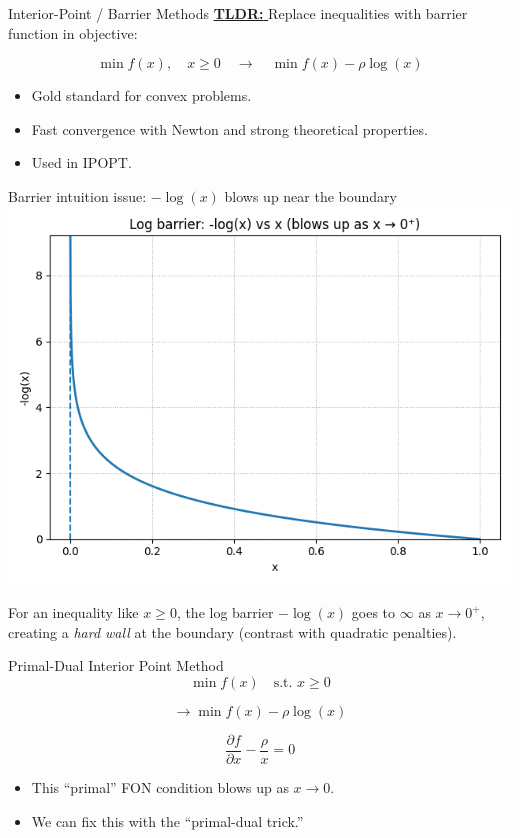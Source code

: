 \begin{frame}{Interior-Point / Barrier Methods}
\underline{\textbf{TLDR: }} Replace inequalities with barrier function in objective:

$$
\min f(x), \quad x \geq 0 \quad \to \quad \min f(x) - \rho \log(x)
$$

\begin{itemize} 
    \item Gold standard for convex problems.
    \item Fast convergence with Newton and strong theoretical properties.
    \item Used in IPOPT.
\end{itemize} 
\end{frame}


\begin{frame}{Barrier intuition issue: $-\log(x)$ blows up near the boundary}
\centering
\includegraphics[scale=0.5]{figures/log_barrier.png}
 
{\small
For an inequality like $x\ge 0$, the log barrier $-\log(x)$ goes to $\infty$ as $x\to 0^+$,
creating a \emph{hard wall} at the boundary (contrast with quadratic penalties).
}
\end{frame}



\begin{frame}{Primal-Dual Interior Point Method}
$$
\min f(x) \quad \text{s.t. } x \geq 0
$$

$$
\to \min f(x) - \rho \log(x)
$$

$$
\frac{\partial f}{\partial x} - \frac{\rho}{x} = 0
$$

\begin{itemize}
    \item This “primal” FON condition blows up as $x \to 0$.
    \item We can fix this with the “primal-dual trick.”
\end{itemize}
\end{frame}  


